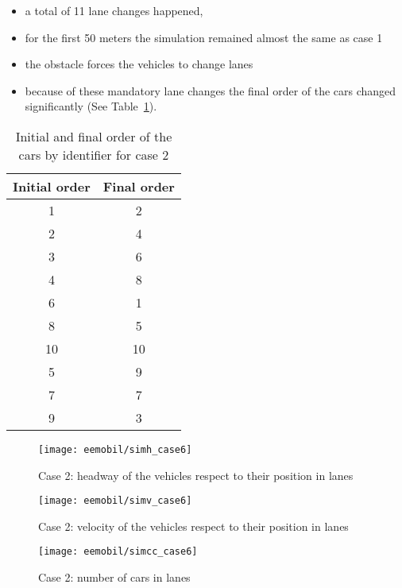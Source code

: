 			\begin{itemize}
				\item a total of 11 lane changes happened,
				\item for the first 50 meters the simulation remained almost the same as case 1
				\item the obstacle forces the vehicles to change lanes
				\item because of these mandatory lane changes the final order of the cars changed significantly (See Table~\ref{tab:car_order_case_2}).
			\end{itemize}
			\begin{table}
				\begin{center}
					\begin{tabular}{ |c|c| }
						\hline
						Initial order & Final order \\
						\hline
						1 & 2\\
						2 & 4\\
						3 & 6\\
						4 & 8\\
						6 & 1\\
						8 & 5\\
						10 & 10\\
						5 & 9\\
						7 & 7\\
						9 & 3\\
						\hline
					\end{tabular}
				\end{center}
				\caption{Initial and final order of the cars by identifier for case 2}
				\label{tab:car_order_case_2}
			\end{table}
			\begin{figure}
				\centering
				\texttt{[image: eemobil/simh\_case6]}
				\caption{Case 2: headway of the vehicles respect to their position in lanes}
				\label{fig:red_light_situationh3}
			\end{figure}
			\begin{figure}
				\centering
				\texttt{[image: eemobil/simv\_case6]}
				\caption{Case 2: velocity of the vehicles respect to their position in lanes}
				\label{fig:red_light_situationv3}
			\end{figure}
			\begin{figure}
				\centering
				\texttt{[image: eemobil/simcc\_case6]}
				\caption{Case 2: number of cars in lanes}
				\label{fig:red_light_situationcc3}
			\end{figure}